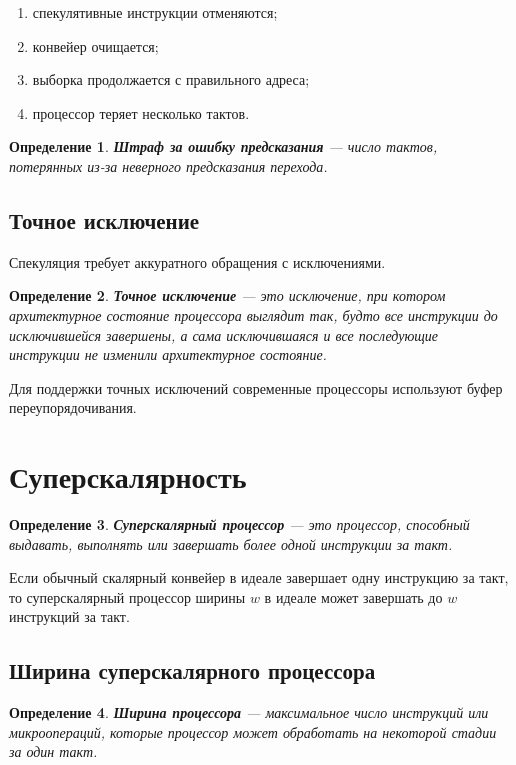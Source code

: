 \documentclass[12pt,a4paper]{article}
\newtheorem{definition}{Определение}
\begin{document}
\begin{enumerate}
    \item спекулятивные инструкции отменяются;
    \item конвейер очищается;
    \item выборка продолжается с правильного адреса;
    \item процессор теряет несколько тактов.
\end{enumerate}

\begin{definition}
\textbf{Штраф за ошибку предсказания} --- число тактов, потерянных из-за неверного предсказания перехода.
\end{definition}

\subsection{Точное исключение}

Спекуляция требует аккуратного обращения с исключениями.

\begin{definition}
\textbf{Точное исключение} --- это исключение, при котором архитектурное состояние процессора выглядит так, будто все инструкции до исключившейся завершены, а сама исключившаяся и все последующие инструкции не изменили архитектурное состояние.
\end{definition}

Для поддержки точных исключений современные процессоры используют буфер переупорядочивания.

\section{Суперскалярность}

\begin{definition}
\textbf{Суперскалярный процессор} --- это процессор, способный выдавать, выполнять или завершать более одной инструкции за такт.
\end{definition}

Если обычный скалярный конвейер в идеале завершает одну инструкцию за такт, то суперскалярный процессор ширины $w$ в идеале может завершать до $w$ инструкций за такт.

\subsection{Ширина суперскалярного процессора}

\begin{definition}
\textbf{Ширина процессора} --- максимальное число инструкций или микроопераций, которые процессор может обработать на некоторой стадии за один такт.
\end{definition}
\end{document}

